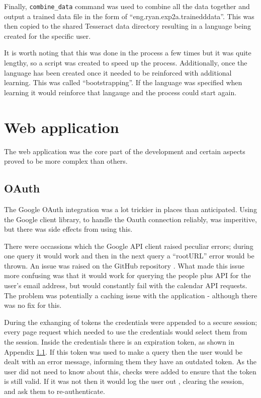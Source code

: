 Finally, \texttt{combine\_data} command was used to combine all the data together and output a trained data file in the form of ``eng.ryan.exp2a.trainedddata''. This was then copied to the shared Tesseract data directory resulting in a language being created for the specific user.

It is worth noting that this was done in the process a few times but it was quite lengthy, so a script was created to speed up the process. Additionally, once the language has been created once it needed to be reinforced with additional learning. This was called ``bootstrapping''. If the language was specified when learning it would reinforce that langauge and the process could start again.


\section{Web application}
The web application was the core part of the development and certain aspects proved to be more complex than others.
\subsection{OAuth}
The Google OAuth integration was a lot trickier in places than anticipated. Using the Google client library, to handle the Oauth connection reliably, was imperitive, but there was side effects from using this.

There were occassions which the Google API client raised peculiar errors; during one query it would work and then in the next query a ``rootURL'' error would be thrown. An issue was raised on the GitHub repository \cite{citeulike:14021433}. What made this issue more confusing was that it would work for querying the people plus API for the user's email address, but would constantly fail with the calendar API requests. The problem was potentially a caching issue with the application - although there was no fix for this.

During the exhanging of tokens the credentials were appended to a secure session; every page request which needed to use the credentials would select them from the session. Inside the credentials there is an expiration token, as shown in Appendix \ref{}. If this token was used to make a query then the user would be dealt with an error message, informing them they have an outdated token. As the user did not need to know about this, checks were added to ensure that the token is still valid. If it was not then it would log the user out , clearing the session, and ask them to re-authenticate.

